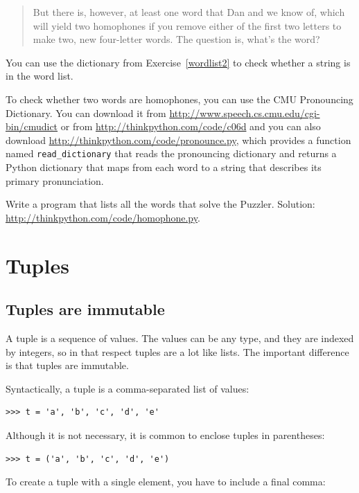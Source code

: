 \documentclass[10pt]{book}
\begin{document}
\begin{CJK}{UTF8}{gbsn}
\begin{exercise}
\begin{quote}
But there is, however, at least one word that Dan and we know of,
which will yield two homophones if you remove either of the first two
letters to make two, new four-letter words. The question is, what's
the word?
\end{quote}

You can use the dictionary from Exercise~\ref{wordlist2} to check
whether a string is in the word list.

To check whether two words are homophones, you can use the CMU
Pronouncing Dictionary.  You can download it from
\url{http://www.speech.cs.cmu.edu/cgi-bin/cmudict} or from
\url{http://thinkpython.com/code/c06d} and you can also download
\url{http://thinkpython.com/code/pronounce.py}, which provides a function
named \verb"read_dictionary" that reads the pronouncing dictionary and
returns a Python dictionary that maps from each word to a string that
describes its primary pronunciation.

Write a program that lists all the words that solve the Puzzler.
Solution: \url{http://thinkpython.com/code/homophone.py}.

\end{exercise}



\chapter{Tuples}
\label{tuplechap}

\section{Tuples are immutable}

A tuple is a sequence of values.  The values can be any type, and
they are indexed by integers, so in that respect tuples are a lot
like lists.  The important difference is that tuples are immutable.

Syntactically, a tuple is a comma-separated list of values:

\begin{verbatim}
>>> t = 'a', 'b', 'c', 'd', 'e'
\end{verbatim}
%
Although it is not necessary, it is common to enclose tuples in
parentheses:

\begin{verbatim}
>>> t = ('a', 'b', 'c', 'd', 'e')
\end{verbatim}
%
To create a tuple with a single element, you have to include a final
comma:


\end{CJK}
\end{document}
